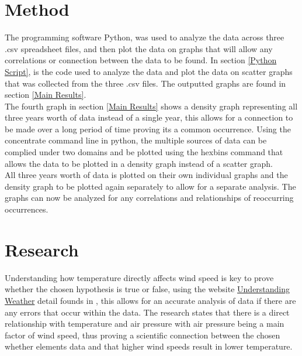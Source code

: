 \documentclass[12pt]{article}
\begin{document}
\section{Method}

The programming software Python, was used to analyze the data across three .csv spreadsheet files, and then plot the data on graphs that will allow any correlations or connection between the data to be found. In section \ref{Python Script}, is the code used to analyze the data and plot the data on scatter graphs that was collected from the three .csv files. The outputted graphs are found in section \ref{Main Results}. \\

The fourth graph in section \ref{Main Results} shows a density graph representing all three years worth of data instead of a single year, this allows for a connection to be made over a long period of time proving its a common occurrence. Using the concentrate command line in python, the multiple sources of data can be complied under two domains and be plotted using the hexbins command that allows the data to be plotted in a density graph instead of a scatter graph. \\

All three years worth of data is plotted on their own individual graphs and the density graph to be plotted again separately to allow for a separate analysis. The graphs can now be analyzed for any correlations and relationships of reoccurring occurrences.


\section{Research}
\label{Research Section}

Understanding how temperature directly affects wind speed is key to prove whether the chosen hypothesis is true or false, using the website \href{https://www.metoffice.gov.uk/learning/weather-for-kids/understanding-weather}{Understanding Weather} detail founds in \cite{Weather_Research}, this allows for an accurate analysis of data if there are any errors that occur within the data. The research states that there is a direct relationship with temperature and air pressure with air pressure being a main factor of wind speed, thus proving a scientific connection between the chosen whether elements data and that higher wind speeds result in lower temperature. \\
\end{document}
